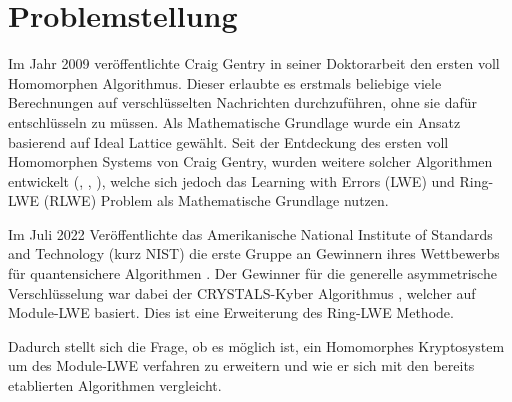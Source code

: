 \chapter{Problemstellung}
\label{Problemstellung}

Im Jahr 2009 veröffentlichte Craig Gentry in seiner Doktorarbeit \cite{Gentry2009AFH} den ersten voll Homomorphen Algorithmus. Dieser erlaubte es erstmals beliebige viele Berechnungen auf verschlüsselten Nachrichten durchzuführen, ohne sie dafür entschlüsseln zu müssen. Als Mathematische Grundlage wurde ein Ansatz basierend auf \glqq Ideal Lattice\grqq{} gewählt. Seit der Entdeckung des ersten voll Homomorphen Systems von Craig Gentry, wurden weitere solcher Algorithmen entwickelt (\cite{BGV}, \cite{FV}, \cite{GSW}), welche sich jedoch das Learning with Errors (LWE) und Ring-LWE (RLWE) Problem als Mathematische Grundlage nutzen.

Im Juli 2022 Veröffentlichte das Amerikanische National Institute of Standards and Technology (kurz NIST) die erste Gruppe an Gewinnern ihres Wettbewerbs für quantensichere Algorithmen \cite{nistAnouncement}. Der Gewinner für die generelle asymmetrische Verschlüsselung war dabei der CRYSTALS-Kyber Algorithmus \cite{crystalsKyberWeb}, welcher auf Module-LWE basiert. Dies ist eine Erweiterung des Ring-LWE Methode.

Dadurch stellt sich die Frage, ob es möglich ist, ein Homomorphes Kryptosystem um des Module-LWE verfahren zu erweitern und wie er sich mit den bereits etablierten Algorithmen vergleicht.